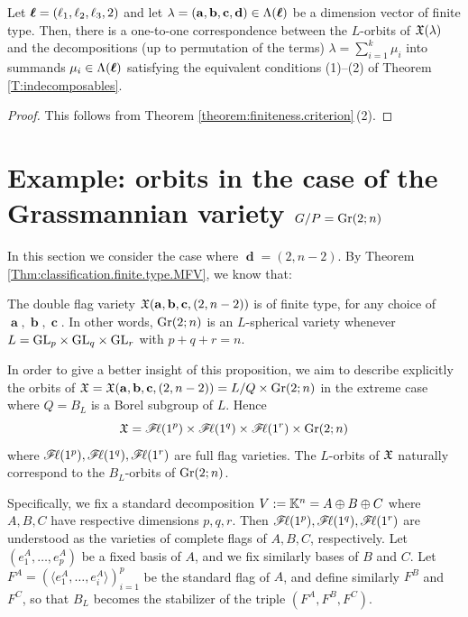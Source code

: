 \documentclass[12pt,reqno]{amsart}
\begin{document}
\begin{corollary}
\label{C:orbits}
Let $\boldsymbol{\ell}=(\ell_1,\ell_2,\ell_3,2)$ and let
$\lambda=(\mathbf{a},\mathbf{b},\mathbf{c},\mathbf{d})\in\Lambda(\boldsymbol{\ell})$
be a dimension vector of finite type.
Then, there is a one-to-one correspondence between the $L$-orbits of $\mathfrak{X}(\lambda)$ and the decompositions (up to permutation of the terms)
$\lambda=\sum_{i=1}^k \mu_i$ into summands $\mu_i\in\Lambda(\boldsymbol{\ell})$ satisfying the equivalent conditions (1)--(2) of Theorem \ref{T:indecomposables}.
\end{corollary}

\begin{proof}
This follows from Theorem \ref{theorem:finiteness.criterion}\,(2).
\end{proof}








\section{Example: orbits in the case of the Grassmannian variety $ G/P = \mathrm{Gr}(2;n) $}

\label{section:5}

In this section we consider the case where $\mbfd=(2,n-2)$.
By Theorem \ref{Thm:classification.finite.type.MFV}, we know that:

\begin{proposition}
The double flag variety $\mathfrak{X}(\mathbf{a},\mathbf{b},\mathbf{c},(2,n-2))$
is of finite type, for any choice of $\mbfa,\mbfb,\mbfc$.
In other words, $\mathrm{Gr}(2;n)$ is an $L$-spherical variety
whenever $L=\mathrm{GL}_p\times \mathrm{GL}_q\times \mathrm{GL}_r$ with $p+q+r=n$.
\end{proposition}

In order to give a better insight of this proposition, we aim to describe explicitly the orbits of $\mathfrak{X}=\mathfrak{X}(\mathbf{a},\mathbf{b},\mathbf{c},(2,n-2))=L/Q\times \mathrm{Gr}(2;n)$
in the extreme case where $Q=B_L$ is a Borel subgroup of $L$. Hence
$$
\mathfrak{X}=\mathscr{F}\!\ell(1^p)\times \mathscr{F}\!\ell(1^q)\times \mathscr{F}\!\ell(1^r)\times \mathrm{Gr}(2;n)
$$
where $\mathscr{F}\!\ell(1^p),\mathscr{F}\!\ell(1^q),\mathscr{F}\!\ell(1^r)$ are full flag varieties.
The $L$-orbits of $\mathfrak{X}$ naturally correspond to the $B_L$-orbits of $\mathrm{Gr}(2;n)$.

Specifically, we fix a standard decomposition
$V:=\mathbb{K}^n=A\oplus B\oplus C$
where $A,B,C$ have respective dimensions $p,q,r$. Then
$\mathscr{F}\!\ell(1^p),\mathscr{F}\!\ell(1^q),\mathscr{F}\!\ell(1^r)$ are understood as the varieties of complete flags of $A,B,C$, respectively.
Let $(e^A_1,\ldots,e^A_p)$ be a fixed basis of $A$, and we fix similarly bases of $B$ and $C$.
Let $F^A=(\langle e^A_1,\ldots,e^A_i\rangle)_{i=1}^p$
be the standard flag of $A$, and define similarly $F^B$ and $F^C$, so that
$B_L$ becomes the stabilizer of the triple $(F^A,F^B,F^C)$.
\end{document}
